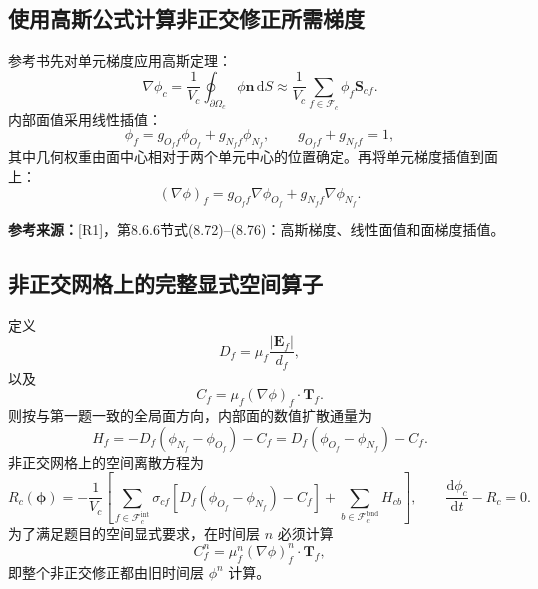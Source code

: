 \documentclass[UTF8,12pt,a4paper]{ctexart}
\numberwithin{equation}{section}
\newcommand{\Rone}{\textnormal{[R1]}}
\newcommand{\source}[1]{%
  \par\smallskip
  \noindent\colorbox{sourcebg}{%
    \parbox{0.955\linewidth}{\raggedright\footnotesize\color{sourcegray}\textbf{参考来源：}#1}%
  }
  \par\smallskip
}
\newcommand{\dd}{\,\mathrm d}
\newcommand{\Sf}{\bm S}
\newcommand{\Ef}{\bm E}
\newcommand{\Tf}{\bm T}
\begin{document}
\subsection{使用高斯公式计算非正交修正所需梯度}

参考书先对单元梯度应用高斯定理：
\begin{equation}
  \nabla\phi_c
  =\frac{1}{V_c}
   \oint_{\partial\Omega_c}\phi\bm n\dd S
  \approx
  \boxed{
  \frac{1}{V_c}
  \sum_{f\in\mathcal F_c}\phi_f\Sf_{cf}}.
  \label{eq:gauss_cell_gradient}
\end{equation}
内部面值采用线性插值：
\begin{equation}
  \phi_f=g_{O_f f}\phi_{O_f}+g_{N_f f}\phi_{N_f},
  \qquad g_{O_f f}+g_{N_f f}=1,
  \label{eq:linear_face_value}
\end{equation}
其中几何权重由面中心相对于两个单元中心的位置确定。再将单元梯度插值到面上：
\begin{equation}
  \boxed{
  (\nabla\phi)_f
  =g_{O_f f}\nabla\phi_{O_f}
  +g_{N_f f}\nabla\phi_{N_f}}.
  \label{eq:face_gradient_interpolation}
\end{equation}

\source{\Rone，第8.6.6节式(8.72)--(8.76)：高斯梯度、线性面值和面梯度插值。}

\subsection{非正交网格上的完整显式空间算子}

定义
\begin{equation}
  D_f=\mu_f\frac{|\Ef_f|}{d_f},
  \label{eq:D_nonorth}
\end{equation}
以及
\begin{equation}
  C_f=\mu_f(\nabla\phi)_f\cdot\Tf_f.
  \label{eq:cross_diffusion}
\end{equation}
则按与第一题一致的全局面方向，内部面的数值扩散通量为
\begin{equation}
  \boxed{
  H_f
  =-D_f(\phi_{N_f}-\phi_{O_f})-C_f
  =D_f(\phi_{O_f}-\phi_{N_f})-C_f}.
  \label{eq:full_nonorth_flux}
\end{equation}
非正交网格上的空间离散方程为
\begin{equation}
  \boxed{
  R_c(\bm\phi)
  =-\frac{1}{V_c}
  \left[
  \sum_{f\in\mathcal F_c^{\mathrm{int}}}\sigma_{cf}
  \left[D_f(\phi_{O_f}-\phi_{N_f})-C_f\right]
  +
  \sum_{b\in\mathcal F_c^{\mathrm{bnd}}}H_{cb}
  \right],
  \qquad
  \frac{\mathrm d\phi_c}{\mathrm dt}-R_c=0}.
  \label{eq:nonorth_semidiscrete}
\end{equation}
为了满足题目的空间显式要求，在时间层 $n$ 必须计算
\begin{equation}
  C_f^n=\mu_f^n(\nabla\phi)_f^n\cdot\Tf_f,
  \label{eq:explicit_correction}
\end{equation}
即整个非正交修正都由旧时间层 $\phi^n$ 计算。
\end{document}
